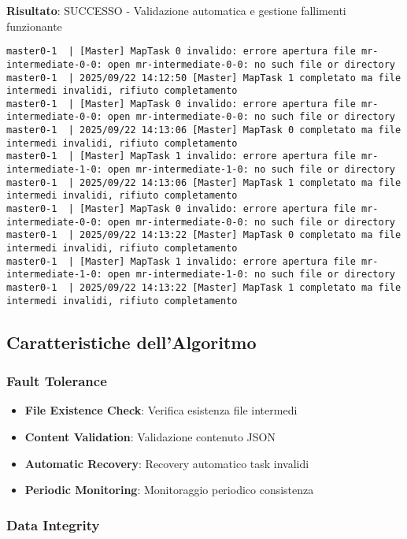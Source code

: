 \documentclass[12pt,a4paper]{article}
\begin{document}
\textbf{Risultato}: SUCCESSO - Validazione automatica e gestione fallimenti funzionante
\begin{lstlisting}
master0-1  | [Master] MapTask 0 invalido: errore apertura file mr-intermediate-0-0: open mr-intermediate-0-0: no such file or directory        
master0-1  | 2025/09/22 14:12:50 [Master] MapTask 1 completato ma file intermedi invalidi, rifiuto completamento
master0-1  | [Master] MapTask 0 invalido: errore apertura file mr-intermediate-0-0: open mr-intermediate-0-0: no such file or directory        
master0-1  | 2025/09/22 14:13:06 [Master] MapTask 0 completato ma file intermedi invalidi, rifiuto completamento
master0-1  | [Master] MapTask 1 invalido: errore apertura file mr-intermediate-1-0: open mr-intermediate-1-0: no such file or directory        
master0-1  | 2025/09/22 14:13:06 [Master] MapTask 1 completato ma file intermedi invalidi, rifiuto completamento
master0-1  | [Master] MapTask 0 invalido: errore apertura file mr-intermediate-0-0: open mr-intermediate-0-0: no such file or directory        
master0-1  | 2025/09/22 14:13:22 [Master] MapTask 0 completato ma file intermedi invalidi, rifiuto completamento
master0-1  | [Master] MapTask 1 invalido: errore apertura file mr-intermediate-1-0: open mr-intermediate-1-0: no such file or directory        
master0-1  | 2025/09/22 14:13:22 [Master] MapTask 1 completato ma file intermedi invalidi, rifiuto completamento
\end{lstlisting}

\subsection{Caratteristiche dell'Algoritmo}

\subsubsection{Fault Tolerance}

\begin{itemize}
\item \textbf{File Existence Check}: Verifica esistenza file intermedi
\item \textbf{Content Validation}: Validazione contenuto JSON
\item \textbf{Automatic Recovery}: Recovery automatico task invalidi
\item \textbf{Periodic Monitoring}: Monitoraggio periodico consistenza
\end{itemize}

\subsubsection{Data Integrity}
\end{document}
